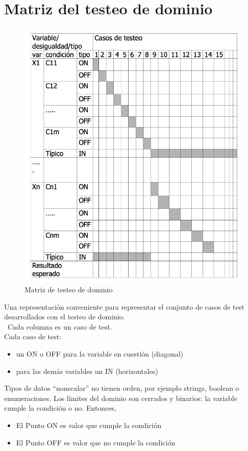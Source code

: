 \section{Matriz del testeo de dominio}
\begin{paracol}{2}
   
   \begin{figure}[htbp]
      \centering
      \includegraphics[width=0.70\columnwidth]{images/05/matrizTesteo.png}
      \caption{Matriz de testeo de dominio}
      \label{fig:05/matrizTesteo}
   \end{figure}

   \switchcolumn  

   \colfill

   Una representación conveniente para representar el conjunto de casos de test desarrollados con el testeo de dominio.\\\
   Cada columna es un caso de test.\\
   Cada caso de test:
   \begin{itemize}
   	\item un ON o OFF para la variable en cuestión (diagonal)
   	\item para las demás variables un IN (horizontales)
   \end{itemize}
   \nl

   Tipos de datos ``nonscalar'' no tienen orden, por ejemplo strings, boolean o enumeraciones.
   Los límites del dominio son cerrados y binarios: la variable cumple la condición o no. Entonces,
      \begin{itemize}
      	\item El Punto ON es valor que cumple la condición
      	\item El Punto OFF es valor que no cumple la condición
      \end{itemize}
   \colfill
\end{paracol}

